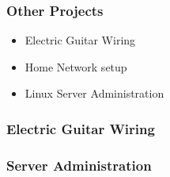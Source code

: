 \documentclass[aspectratio=169]{beamer}
\begin{document}
\begin{frame}
  \frametitle{Other Projects}
  \begin{itemize}
  \item Electric Guitar Wiring
  \item Home Network setup
  \item Linux Server Administration
  \end{itemize}
  
\end{frame}

\begin{frame}
  \frametitle{Electric Guitar Wiring}
\end{frame}

\begin{frame}
\frametitle{Server Administration}
\end{frame}
\end{document}
